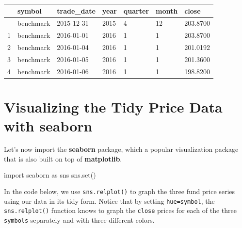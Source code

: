 \documentclass[
  letterpaper,
  DIV=11,
  numbers=noendperiod]{scrreprt}
\newenvironment{Shaded}{\begin{snugshade}}{\end{snugshade}}
\newcommand{\BuiltInTok}[1]{\textcolor[rgb]{0.00,0.23,0.31}{#1}}
\newcommand{\ImportTok}[1]{\textcolor[rgb]{0.00,0.46,0.62}{#1}}
\newcommand{\NormalTok}[1]{\textcolor[rgb]{0.00,0.23,0.31}{#1}}
\begin{document}
\begin{longtable}[]{@{}lllllll@{}}
\toprule\noalign{}
& symbol & trade\_date & year & quarter & month & close \\
\midrule\noalign{}
\endhead
\bottomrule\noalign{}
\endlastfoot
0 & benchmark & 2015-12-31 & 2015 & 4 & 12 & 203.8700 \\
1 & benchmark & 2016-01-01 & 2016 & 1 & 1 & 203.8700 \\
2 & benchmark & 2016-01-04 & 2016 & 1 & 1 & 201.0192 \\
3 & benchmark & 2016-01-05 & 2016 & 1 & 1 & 201.3600 \\
4 & benchmark & 2016-01-06 & 2016 & 1 & 1 & 198.8200 \\
\end{longtable}

\hypertarget{visualizing-the-tidy-price-data-with-seaborn}{%
\section{\texorpdfstring{Visualizing the Tidy Price Data with
\textbf{seaborn}}{Visualizing the Tidy Price Data with seaborn}}\label{visualizing-the-tidy-price-data-with-seaborn}}

Let's now import the \textbf{seaborn} package, which a popular
visualization package that is also built on top of \textbf{matplotlib}.

\begin{Shaded}
\begin{Highlighting}[]
\ImportTok{import}\NormalTok{ seaborn }\ImportTok{as}\NormalTok{ sns}
\NormalTok{sns.}\BuiltInTok{set}\NormalTok{()}
\end{Highlighting}
\end{Shaded}

In the code below, we use \texttt{sns.relplot()} to graph the three fund
price series using our data in its tidy form. Notice that by setting
\texttt{hue=\textquotesingle{}symbol\textquotesingle{}}, the
\texttt{sns.relplot()} function knows to graph the \texttt{close} prices
for each of the three \texttt{symbols} separately and with three
different colors.
\end{document}
